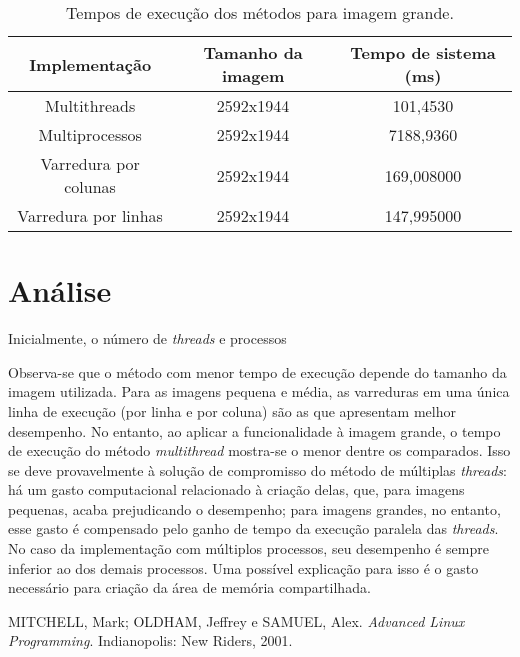 \documentclass[a4paper, 10pt, conference]{ieeeconf}
\begin{document}
\begin{table}[]
	\centering
	\caption{Tempos de execução dos métodos para imagem grande.}
	\label{tabela4}
	\begin{tabular}{|c|c|c|}
		\hline
		\textbf{Implementação} & \textbf{Tamanho da imagem} & \textbf{Tempo de sistema (ms)} \\ \hline
		Multithreads           & 2592x1944                  & 101,4530                       \\ \hline
		Multiprocessos         & 2592x1944                  & 7188,9360                      \\ \hline
		Varredura por colunas  & 2592x1944                  & 169,008000                     \\ \hline
		Varredura por linhas   & 2592x1944                  & 147,995000                     \\ \hline
	\end{tabular}
\end{table}


\section{Análise}


Inicialmente, o número de \textit{threads} e processos 

Observa-se que o método com menor tempo de execução depende do tamanho da imagem utilizada. Para as imagens pequena e média, as varreduras em uma única linha de execução (por linha e por coluna) são as que apresentam melhor desempenho. No entanto, ao aplicar a funcionalidade à imagem grande, o tempo de execução do método \textit{multithread} mostra-se o menor dentre os comparados. Isso se deve provavelmente à solução de compromisso do método de múltiplas \textit{threads}: há um gasto computacional relacionado à criação delas, que, para imagens pequenas, acaba prejudicando o desempenho; para imagens grandes, no entanto, esse gasto é compensado pelo ganho de tempo da execução paralela das \textit{threads}. No caso da implementação com múltiplos processos, seu desempenho é sempre inferior ao dos demais processos. Uma possível explicação para isso é o gasto necessário para criação da área de memória compartilhada.

\begin{thebibliography}{99}

 MITCHELL, Mark; OLDHAM, Jeffrey e SAMUEL, Alex. \textit{Advanced Linux Programming}. Indianopolis: New Riders, 2001.

\end{thebibliography}
\end{document}
